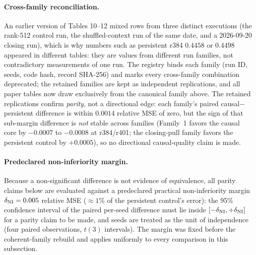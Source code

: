 \paragraph{Cross-family reconciliation.}
An earlier version of Tables 10--12 mixed rows from three distinct
executions (the rank-512 control run, the shuffled-context run of the same
date, and a 2026-09-20 closing run), which is why numbers such as
persistent r384 $0.4458$ or $0.4498$ appeared in different tables: they are
values from different run families, not contradictory measurements of one
run.  The registry binds each family (run ID, seeds, code hash, record
SHA-256) and marks every cross-family combination deprecated; the retained
families are kept as independent replications, and all paper
tables now draw exclusively from the canonical family above.  The retained
replications confirm \emph{parity}, not a directional edge: each family's
paired causal$-$persistent difference is within $0.0014$ relative MSE of
zero, but the sign of that sub-margin difference is \emph{not} stable across
families (Family~1 favors the causal core by $-0.0007$ to $-0.0008$ at
r384/r401; the closing-pull family favors the persistent control by
$+0.0005$), so no directional causal-quality claim is made.



\paragraph{Predeclared non-inferiority margin.}
Because a non-significant difference is not evidence of equivalence, all
parity claims below are evaluated against a predeclared practical
non-inferiority margin $\delta_{\rm NI}=0.005$ relative MSE
($\approx1\%$ of the persistent control's error): the 95\% confidence
interval of the paired per-seed difference must lie inside
$[-\delta_{\rm NI},+\delta_{\rm NI}]$ for a parity claim to be made, and
seeds are treated as the unit of independence (four paired observations,
$t(3)$ intervals).  The margin was fixed before the coherent-family rebuild
and applies uniformly to every comparison in this subsection.


